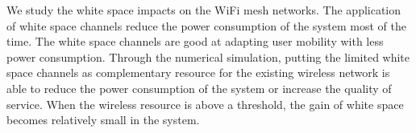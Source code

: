 

We study the white space impacts on the WiFi mesh networks. The application of white space channels reduce the 
power consumption of the system most of the time. The white space channels are good at adapting user mobility 
with less power consumption. Through the numerical simulation, putting the limited white space channels as complementary 
resource for the existing wireless network is able to reduce the power consumption of the system or increase the 
quality of service. When the wireless resource is above a threshold, the gain of white space becomes relatively 
small in the system.


